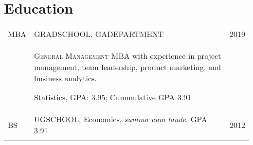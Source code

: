 \documentclass[a4paper,10pt]{article}
\begin{document}
\section{Education}
\begin{supertabular}{p{1.5cm}p{13.9cm}>{\raggedleft\arraybackslash}p{1.5cm}}
	\textsc{MBA} & \textsc{GRADSCHOOL}, \small GADEPARTMENT 			
	& 	\textsc{2019} \\
	& \begin{enumerate*}[label =$\circ$, itemjoin={\newline}] 
	\item \footnotesize \textsc{General Management} MBA with experience in project management, team leadership, product marketing, and business analytics.
	\item \footnotesize \small Statistics, GPA: 3.95; Cummulative GPA 3.91
	\end{enumerate*} 														
	& \\
	\textsc{BS} & \textsc{UGSCHOOL}, \small Economics, \emph{summa cum laude}, GPA 3.91 
	&	\textsc{2012} 	\\
	 \\
\end{supertabular}



\end{document}
